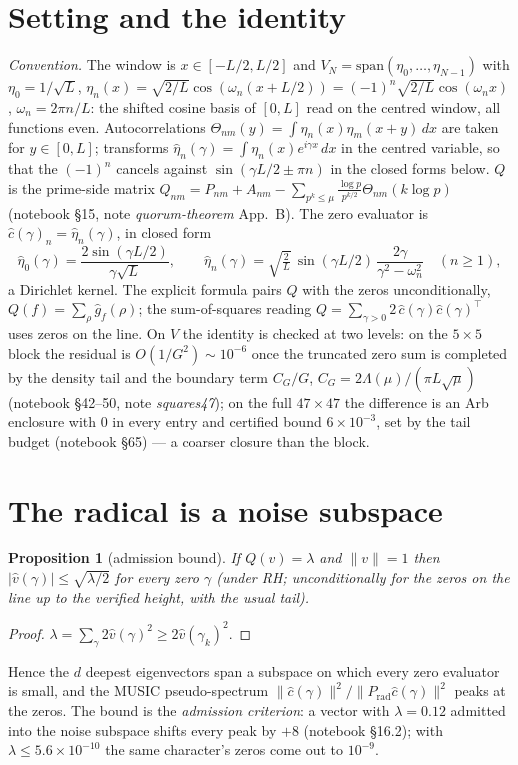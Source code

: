 \documentclass[11pt]{article}
\newtheorem{proposition}{Proposition}\newtheorem{theorem}[proposition]{Theorem}
\theoremstyle{remark}\newtheorem*{remark}{Remark}
\begin{document}
\section{Setting and the identity}
\emph{Convention.} The window is $x\in[-L/2,L/2]$ and $V_N=\mathrm{span}(\eta_0,\dots,\eta_{N-1})$ with $\eta_0=1/\sqrt L$, $\eta_n(x)=\sqrt{2/L}\cos(\omega_n(x+L/2))=(-1)^n\sqrt{2/L}\cos(\omega_nx)$, $\omega_n=2\pi n/L$: the shifted cosine basis of $[0,L]$ read on the centred window, all functions even. Autocorrelations $\Theta_{nm}(y)=\int\eta_n(x)\eta_m(x+y)\,dx$ are taken for $y\in[0,L]$; transforms $\hat\eta_n(\gamma)=\int\eta_n(x)e^{i\gamma x}\,dx$ in the centred variable, so that the $(-1)^n$ cancels against $\sin(\gamma L/2\pm\pi n)$ in the closed forms below. $Q$ is the prime-side matrix $Q_{nm}=P_{nm}+A_{nm}-\sum_{p^k\le\mu}\frac{\log p}{p^{k/2}}\Theta_{nm}(k\log p)$ (notebook \S15, note \emph{quorum-theorem} App.~B). The zero evaluator is $\hat c(\gamma)_n=\hat\eta_n(\gamma)$, in closed form
\[
\hat\eta_0(\gamma)=\frac{2\sin(\gamma L/2)}{\gamma\sqrt L},\qquad
\hat\eta_n(\gamma)=\sqrt{\tfrac2L}\,\sin(\gamma L/2)\,\frac{2\gamma}{\gamma^2-\omega_n^2}\quad(n\ge1),
\]
a Dirichlet kernel. The explicit formula pairs $Q$ with the zeros unconditionally, $Q(f)=\sum_\rho\hat g_f(\rho)$; the sum-of-squares reading $Q=\sum_{\gamma>0}2\,\hat c(\gamma)\hat c(\gamma)^{\!\top}$ uses zeros on the line. On $V$ the identity is checked at two levels: on the $5\times5$ block the residual is $O(1/G^2)\sim10^{-6}$ once the truncated zero sum is completed by the density tail and the boundary term $C_G/G$, $C_G=2\Lambda(\mu)/(\pi L\sqrt\mu)$ (notebook \S42--50, note \emph{squares47}); on the full $47\times47$ the difference is an Arb enclosure with $0$ in every entry and certified bound $6\times10^{-3}$, set by the tail budget (notebook \S65) --- a coarser closure than the block.

\section{The radical is a noise subspace}
\begin{proposition}[admission bound]
If $Q(v)=\lambda$ and $\|v\|=1$ then $|\hat v(\gamma)|\le\sqrt{\lambda/2}$ for every zero $\gamma$ (under RH; unconditionally for the zeros on the line up to the verified height, with the usual tail).
\end{proposition}
\begin{proof} $\lambda=\sum_\gamma 2\hat v(\gamma)^2\ge 2\hat v(\gamma_k)^2$. \end{proof}
Hence the $d$ deepest eigenvectors span a subspace on which every zero evaluator is small, and the MUSIC pseudo-spectrum $\|\hat c(\gamma)\|^2/\|P_{\mathrm{rad}}\hat c(\gamma)\|^2$ peaks at the zeros. The bound is the \emph{admission criterion}: a vector with $\lambda=0.12$ admitted into the noise subspace shifts every peak by $+8$ (notebook \S16.2); with $\lambda\le5.6\times10^{-10}$ the same character's zeros come out to $10^{-9}$.
\end{document}
